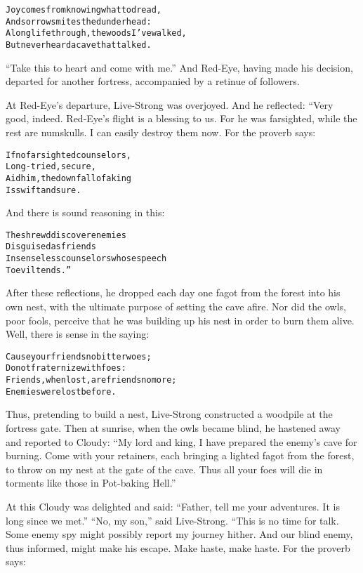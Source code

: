 \documentclass{article}
\renewenvironment{verbatim}{\begin{alltt}\normalfont\begin{centering}}{\end{centering}\end{alltt}}
\begin{document}
\begin{verbatim}
Joy comes from knowing what to dread,
And sorrow smites the dunderhead:
A long life through, the woods I've walked,
But never heard a cave that talked.                     
\end{verbatim}
``Take this to heart and come with me.'' And Red-Eye, having made
his decision, departed for another fortress, accompanied by a
retinue of followers.

At Red-Eye's departure, Live-Strong was overjoyed. And he
reflected: “Very good, indeed. Red-Eye's flight is a blessing to
us. For he was farsighted, while the rest are numskulls. I can
easily destroy them now. For the proverb says:

\begin{verbatim}
If no farsighted counselors,
    Long-tried, secure,
Aid him, the downfall of a king
    Is swift and sure.
\end{verbatim}
And there is sound reasoning in this:

\begin{verbatim}
The shrewd discover enemies
    Disguised as friends
In senseless counselors whose speech
    To evil tends.”
\end{verbatim}
After these reflections, he dropped each day one fagot from the
forest into his own nest, with the ultimate purpose of setting the
cave afire. Nor did the owls, poor fools, perceive that he was
building up his nest in order to burn them alive. Well, there is
sense in the saying:

\begin{verbatim}
Cause your friends no bitter woes;
Do not fraternize with foes:
Friends, when lost, are friends no more;
Enemies were lost before.
\end{verbatim}
Thus, pretending to build a nest, Live-Strong constructed a
woodpile at the fortress gate. Then at sunrise, when the owls
became blind, he hastened away and reported to Cloudy:
``My lord and king, I have prepared the enemy's cave for burning. Come with your retainers, each bringing a lighted fagot from the forest, to throw on my nest at the gate of the cave. Thus all your foes will die in torments like those in Pot-baking Hell.''

At this Cloudy was delighted and said:
``Father, tell me your adventures. It is long since we met.''
``No, my son,'' said Live-Strong. “This is no time for talk. Some
enemy spy might possibly report my journey hither. And our blind
enemy, thus informed, might make his escape. Make haste, make
haste. For the proverb says:
\end{document}
